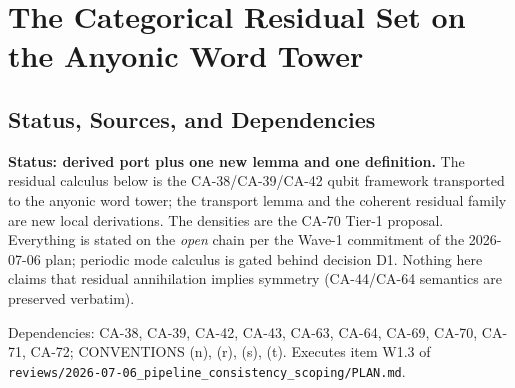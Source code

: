 
\section{The Categorical Residual Set on the Anyonic Word Tower}
\label{sec:categorical-residual-set}

\subsection{Status, Sources, and Dependencies}

\textbf{Status: derived port plus one new lemma and one definition.}  The
residual calculus below is the CA-38/CA-39/CA-42 qubit framework transported
to the anyonic word tower; the transport lemma and the coherent residual
family are new local derivations.  The densities are the CA-70 Tier-1
proposal.  Everything is stated on the \emph{open} chain per the Wave-1
commitment of the 2026-07-06 plan; periodic mode calculus is gated behind
decision D1.  Nothing here claims that residual annihilation implies
symmetry (CA-44/CA-64 semantics are preserved verbatim).

Dependencies: CA-38, CA-39, CA-42, CA-43, CA-63, CA-64, CA-69, CA-70,
CA-71, CA-72; CONVENTIONS (n), (r), (s), (t).  Executes item W1.3 of
\texttt{reviews/2026-07-06\_pipeline\_consistency\_scoping/PLAN.md}.

